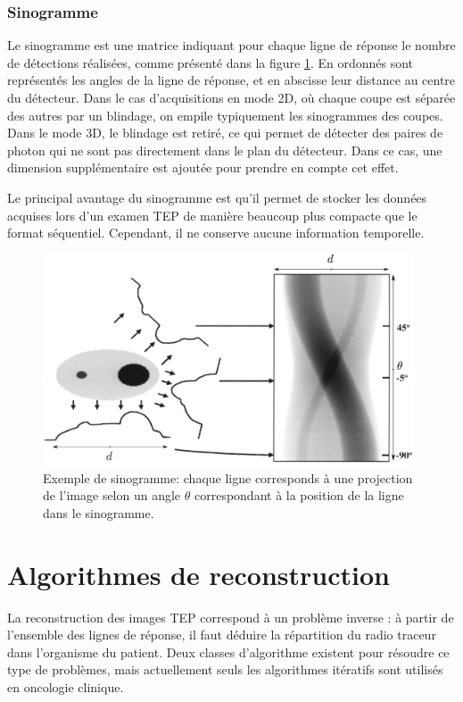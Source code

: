 		\subsection{Sinogramme}

Le sinogramme est une matrice indiquant pour chaque ligne de réponse le nombre de détections réalisées, comme présenté dans la figure \ref{fig:sino}. En ordonnés sont représentés les angles de la ligne de réponse, et en abscisse leur distance au centre du détecteur\cite{fahey2002data}. Dans le cas d'acquisitions en mode 2D, où chaque coupe est séparée des autres par un blindage, on empile typiquement les sinogrammes des coupes. Dans le mode 3D, le blindage est retiré, ce qui permet de détecter des paires de photon qui ne sont pas directement dans le plan du détecteur. Dans ce cas, une dimension supplémentaire est ajoutée pour prendre en compte cet effet.

Le principal avantage du sinogramme est qu'il permet de stocker les données acquises lors d'un examen TEP de manière beaucoup plus compacte que le format séquentiel. Cependant, il ne conserve aucune information temporelle.

\begin{figure}
\centering
\includegraphics[width=11cm]{images/sino}
\caption[Principe du sinogramme]{Exemple de sinogramme: chaque ligne corresponds à une projection de l'image selon un angle $\theta$ correspondant à la position de la ligne dans le sinogramme.}
\label{fig:sino}
\end{figure}


\chapter{Algorithmes de reconstruction}

La reconstruction des images TEP correspond à un problème inverse : à partir de l'ensemble des lignes de réponse, il faut déduire la répartition du radio traceur dans l'organisme du patient. Deux classes d'algorithme existent pour résoudre ce type de problèmes, mais actuellement seuls les algorithmes itératifs sont utilisés en oncologie clinique. 

